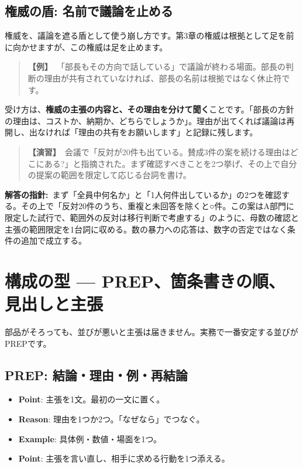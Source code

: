 \documentclass{article}
\begin{document}
\subsection{権威の盾: 名前で議論を止める}

権威を、議論を遮る盾として使う崩し方です。第3章の権威は根拠として足を前に向かせますが、この権威は足を止めます。

\begin{quote}
\textbf{【例】}\ 「部長もその方向で話している」で議論が終わる場面。部長の判断の理由が共有されていなければ、部長の名前は根拠ではなく休止符です。
\end{quote}

受け方は、\textbf{権威の主張の内容と、その理由を分けて聞く}ことです。「部長の方針の理由は、コストか、納期か、どちらでしょうか」。理由が出てくれば議論は再開し、出なければ「理由の共有をお願いします」と記録に残します。

\begin{quote}
\textbf{【演習】}\ 会議で「反対が20件も出ている。賛成3件の案を続ける理由はどこにある?」と指摘された。まず確認すべきことを2つ挙げ、その上で自分の提案の範囲を限定して応じる台詞を書け。
\end{quote}

\textbf{解答の指針:}\ まず「全員中何名か」と「1人何件出しているか」の2つを確認する。その上で「反対20件のうち、重複と未回答を除くと○件。この案はA部門に限定した試行で、範囲外の反対は移行判断で考慮する」のように、母数の確認と主張の範囲限定を1台詞に収める。数の暴力への応答は、数字の否定ではなく条件の追加で成立する。

\section{構成の型 — PREP、箇条書きの順、見出しと主張}

部品がそろっても、並びが悪いと主張は届きません。実務で一番安定する並びがPREPです。

\subsection{PREP: 結論・理由・例・再結論}

\begin{itemize}
\item \textbf{Point}: 主張を1文。最初の一文に置く。
\item \textbf{Reason}: 理由を1つか2つ。「なぜなら」でつなぐ。
\item \textbf{Example}: 具体例・数値・場面を1つ。
\item \textbf{Point}: 主張を言い直し、相手に求める行動を1つ添える。
\end{itemize}
\end{document}

